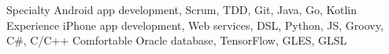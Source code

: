 
\begin{cvskills}
	\cvskill
		{Specialty}
		{Android app development,\enskip 
		Scrum,\enskip 
		TDD,\enskip 
		Git,\enskip 
		Java,\enskip 
		Go,\enskip 
		Kotlin}
	\cvskill
		{Experience}
		{iPhone app development,\enskip 
		Web services,\enskip 
		DSL,\enskip 
		Python,\enskip 
		JS,\enskip 
		Groovy,\enskip 
		C\#,\enskip 
		C/C++}
	\cvskill
		{Comfortable}
		{Oracle database,\enskip 
		TensorFlow,\enskip 
		GLES,\enskip 
		GLSL}
\end{cvskills}

